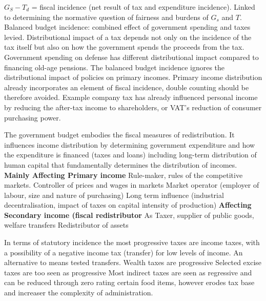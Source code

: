 \documentclass[12pt]{examnotes}
\begin{document}
\ra $G_S-T_d$ = fiscal incidence (net result of tax and expenditure incidence). Linked to determining the normative question of fairness and burdens of $G_s$ and $T$.
\ra Balanced budget incidence: combined effect of government spending and taxes levied. Distributional impact of a tax depends not only on the incidence of the tax itself but also on how the government spends the proceeds from the tax.
\ra Government spending on defense has different distributional impact compared to financing old-age pensions.
\ra The balanced budget incidence ignores the distributional impact of policies on primary incomes. Primary income distribution already incorporates an element of fiscal incidence, double counting should be therefore avoided. Example company tax has already influenced personal income by reducing the after-tax income to shareholders, or VAT's reduction of consumer purchasing power.

\ra The government budget embodies the fiscal measures of redistribution. It influences income distribution by determining government expenditure and how the expenditure is financed (taxes and loans) including long-term distribution of human capital that fundamentally determines the distribution of incomes.
{\bf Mainly Affecting Primary income}
\ra Rule-maker, rules of the competitive markets.
\ra Controller of prices and wages in markets
\ra Market operator (employer of labour, size and nature of purchasing)
\ra Long term influence (industrial decentralisation, impact of taxes on capital intensity of production)
{\bf Affecting Secondary income (fiscal redistributor}
\ra As Taxer, supplier of public goods, welfare transfers
\ra Redistributor of assets  

\ra In terms of statutory incidence the most progressive taxes are income taxes, with a possibility of a negative income tax (transfer) for low levels of income. An alternative to means tested transfers.
\ra Wealth taxes are progressive
\ra Selected excise taxes are too seen as progressive
\ra Most indirect taxes are seen as regressive and can be reduced through zero rating certain food items, however erodes tax base and increaser the complexity of administration.
\end{document}
